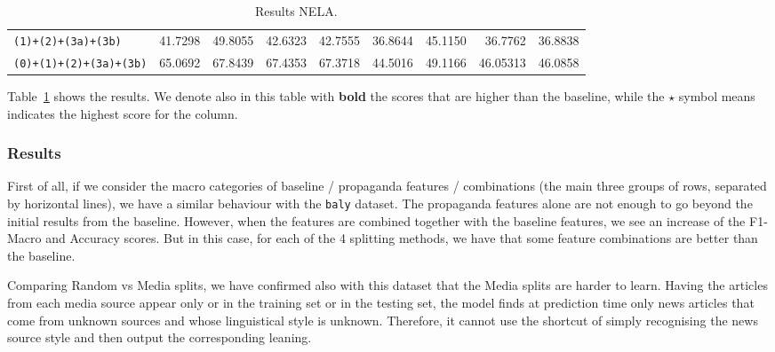 \begin{table}[!htbp]
{\begin{tabular}{l|rr|rr|rr|rr}
            \texttt{(1)+(2)+(3a)+(3b)}          & 41.7298                                        & 49.8055                                      & 42.6323                                       & 42.7555                                     & 36.8644                 & 45.1150                 & 36.7762                 & 36.8838                 \\
            \texttt{(0)+(1)+(2)+(3a)+(3b)}      & 65.0692                                        & 67.8439                                      & 67.4353                                       & 67.3718                                     & 44.5016                 & 49.1166                 & 46.05313                & 46.0858                 \\
        \end{tabular}
    }
    \caption{Results NELA.}
    \label{tab:results_prop_features_classifier_nela}
\end{table}

Table~\ref{tab:results_prop_features_classifier_nela} shows the results. We denote also in this table with \textbf{bold} the scores that are higher than the baseline, while the $\star$ symbol means indicates the highest score for the column.

\subsubsection{Results}

First of all, if we consider the macro categories of baseline / propaganda features / combinations (the main three groups of rows, separated by horizontal lines), we have a similar behaviour with the \texttt{baly} dataset. The propaganda features alone are not enough to go beyond the initial results from the baseline. However, when the features are combined together with the baseline features, we see an increase of the F1-Macro and Accuracy scores.
But in this case, for each of the 4 splitting methods, we have that some feature combinations are better than the baseline.

Comparing Random vs Media splits, we have confirmed also with this dataset that the Media splits are harder to learn. Having the articles from each media source appear only or in the training set or in the testing set, the model finds at prediction time only news articles that come from unknown sources and whose linguistical style is unknown. Therefore, it cannot use the shortcut of simply recognising the news source style and then output the corresponding leaning.

